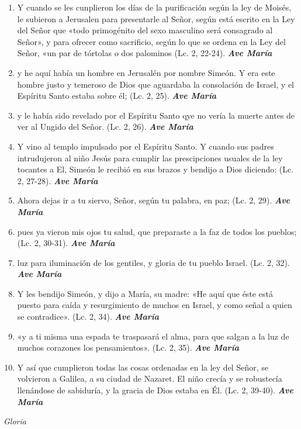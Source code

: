 \documentclass[a4paper,11pt, oneside]{report}
\begin{document}
\begin{enumerate}
  
  \item Y cuando se les cunplieron los días de la purificación según la ley de Moisés, le subieron a Jerusalen para presentarle al Señor, 
  según está escrito en la Ley del Señor que «todo primogénito del sexo masculino será consagrado al Señor», y para ofrecer como sacrificio, 
  según lo que se ordena en la Ley del Señor, «un par de tórtolas o dos palominos
  (Lc. 2, 22-24). \textbf{\textit{Ave María}}

  \item y he aquí había un hombre en Jerusalén por nombre Simeón. Y era este hombre justo y temeroso de Dios que aguardaba la consolación de Israel, 
  y el Espíritu Santo estaba sobre él; (Lc. 2, 25). \textbf{\textit{Ave María}}

  \item y le había sido revelado por el Espíritu Santo qye no vería la muerte antes de ver al Ungido del Señor. (Lc. 2, 26). \textbf{\textit{Ave María}}

  \item Y vino al templo impulsado por el Espíritu Santo. Y cuando sus padres intrudujeron al niño Jesús para cumplir las prescipciones usuales
  de la ley tocantes a El, Simeón le recibió en sus brazos y bendijo a Dios diciendo: (Lc. 2, 27-28). \textbf{\textit{Ave María}}

  \item Ahora dejas ir a tu siervo, Señor, según tu palabra, en paz; (Lc. 2, 29). \textbf{\textit{Ave María}}

  \item pues ya vieron mis ojos tu salud, que preparaste a la faz de todos los pueblos; (Lc. 2, 30-31). \textbf{\textit{Ave María}}

  \item luz para iluminación de los gentiles, y gloria de tu pueblo Israel. (Lc. 2, 32). \textbf{\textit{Ave María}}

  \item Y les bendijo Simeón, y dijo a María, su madre: «He aquí que éste está puesto para caída y resurgimiento de muchos en Israel, y como
  señal a quien se contradice». (Lc. 2, 34). \textbf{\textit{Ave María}}

  \item «y a ti misma una espada te traspasará el alma, para que salgan a la luz de muchos corazones los pensamientos». (Lc. 2, 35). \textbf{\textit{Ave María}}

  \item Y así que cumplieron todas las cosas ordenadas en la ley del Señor, se volvieron a Galilea, a su ciudad de Nazaret. El niño crecía
  y se robustecía llenándose de sabiduría, y la gracia de Dios estaba en Él. (Lc. 2, 39-40). \textbf{\textit{Ave María}} 

\end{enumerate}
\indent\textit{Gloria}
  
\end{document}
